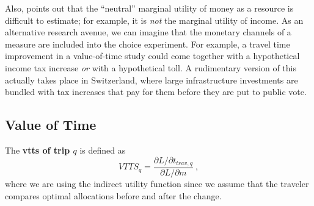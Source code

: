 Also, \cite{Small2012ValuationOfTimeRevisited} points out that the ``neutral'' marginal utility of money as a resource is difficult to estimate; for example, it is \emph{not} the marginal utility of income.  As an alternative research avenue, we can imagine that the monetary channels of a measure are included into the choice experiment.  For example, a travel time improvement in a value-of-time study could come together with a hypothetical income tax increase \emph{or} with a hypothetical toll.  A rudimentary version of this actually takes place in Switzerland, where large infrastructure investments are bundled with tax increases that pay for them before they are put to public vote. 







\subsection{Value of Time}

The \textbf{\gls{vtts} of trip $q$} is defined as
%
\begin{equation}
VTTS_q = \frac{\partial L/\partial t_{trav,q}}{\partial L/\partial m} \ ,
\label{eq:vot}
\end{equation}
where we are using the indirect utility function since we assume that the traveler compares optimal allocations before and after the change.

